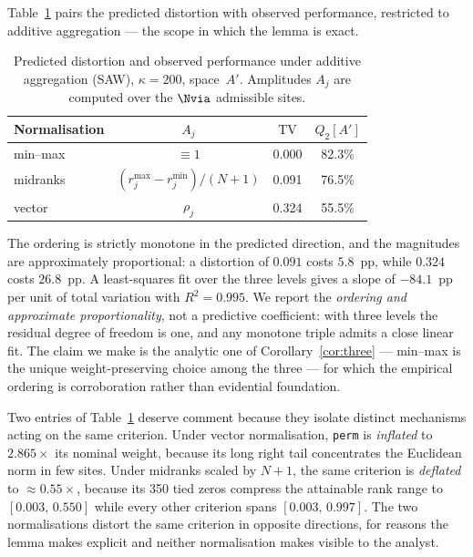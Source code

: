 Table~\ref{tab:tvorder} pairs the predicted distortion with observed
performance, restricted to additive aggregation --- the scope in which
the lemma is exact.

\begin{table}[t]
\centering
\caption{Predicted distortion and observed performance under additive
  aggregation (SAW), $\kappa=200$, space~$A'$.
  Amplitudes $A_j$ are computed over the $\Nvia$ admissible sites.}
\label{tab:tvorder}
\begin{tabular}{lccc}
\toprule
Normalisation & $A_j$ & $\mathrm{TV}$ & $Q_2[A']$ \\
\midrule
min--max & $\equiv 1$                        & 0.000 & 82.3\% \\
midranks & $(r_j^{\max}-r_j^{\min})/(N{+}1)$ & 0.091 & 76.5\% \\
vector   & $\rho_j$                          & 0.324 & 55.5\% \\
\bottomrule
\end{tabular}
\end{table}

The ordering is strictly monotone in the predicted direction, and the
magnitudes are approximately proportional: a distortion of $0.091$
costs $5.8$~pp, while $0.324$ costs $26.8$~pp.
A least-squares fit over the three levels gives a slope of
$-84.1$~pp per unit of total variation with $R^2=0.995$.
We report the \emph{ordering and approximate proportionality}, not a
predictive coefficient: with three levels the residual degree of freedom
is one, and any monotone triple admits a close linear fit.
The claim we make is the analytic one of Corollary~\ref{cor:three} ---
min--max is the unique weight-preserving choice among the three ---
for which the empirical ordering is corroboration rather than
evidential foundation.

Two entries of Table~\ref{tab:tvorder} deserve comment because they
isolate distinct mechanisms acting on the same criterion.
Under vector normalisation, \texttt{perm} is \emph{inflated} to
$2.865\times$ its nominal weight, because its long right tail
concentrates the Euclidean norm in few sites.
Under midranks scaled by $N+1$, the same criterion is \emph{deflated}
to $\approx0.55\times$, because its 350 tied zeros compress the
attainable rank range to $[0.003,\,0.550]$ while every other criterion
spans $[0.003,\,0.997]$.
The two normalisations distort the same criterion in opposite
directions, for reasons the lemma makes explicit and neither
normalisation makes visible to the analyst.

